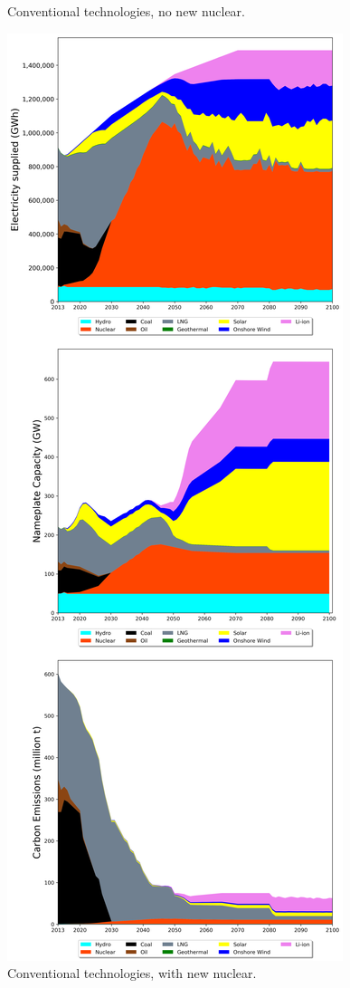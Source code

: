 \begin{figure}[htb]
\caption{Conventional technologies, no new nuclear.}
\end{figure}

\begin{figure}[h] 
\centering
\label{scen2}
\includegraphics[scale=0.3]{figures/conv_nuc}
\caption{Conventional technologies, with new nuclear.}
\end{figure}

